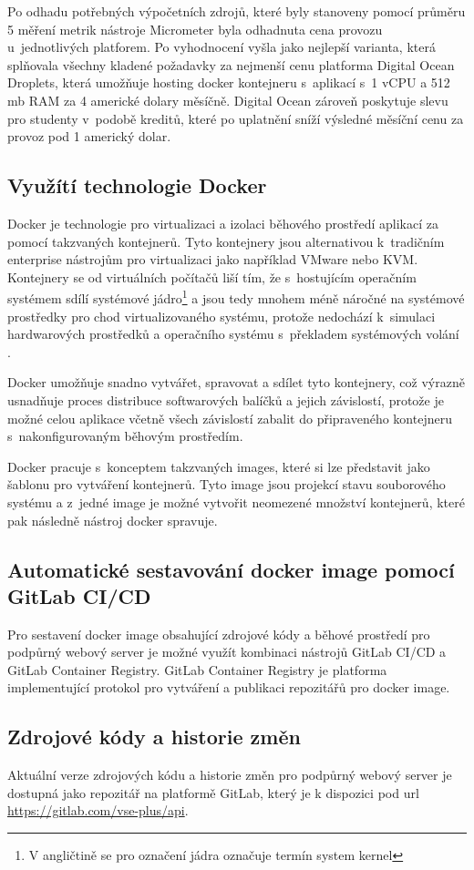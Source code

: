 Po odhadu potřebných výpočetních zdrojů, které byly stanoveny pomocí průměru 5 měření metrik nástroje Micrometer byla odhadnuta cena provozu u~jednotlivých platforem. Po vyhodnocení vyšla jako nejlepší varianta, která splňovala všechny kladené požadavky za nejmenší cenu platforma Digital Ocean Droplets, která umožňuje hosting docker kontejneru s~aplikací s~1 vCPU a 512 mb RAM za 4 americké dolary měsíčně. Digital Ocean zároveň poskytuje slevu pro studenty v~podobě kreditů, které po uplatnění sníží výsledné měsíční cenu za provoz pod 1 americký dolar.  


\subsection{Využítí technologie Docker}\label{sec:docker}

Docker je technologie pro virtualizaci a izolaci běhového prostředí aplikací za pomocí takzvaných kontejnerů. Tyto kontejnery jsou alternativou k~tradičním enterprise nástrojům pro virtualizaci jako například VMware nebo KVM. Kontejnery se od virtuálních počítačů liší tím, že s~hostujícím operačním systémem sdílí systémové jádro\footnote{V angličtině se pro označení jádra označuje termín system kernel} a jsou tedy mnohem méně náročné na systémové prostředky pro chod virtualizovaného systému, protože nedochází k~simulaci hardwarových prostředků a operačního systému s~překladem systémových volání \cite[kap. 1]{kane_docker_2018}.

Docker umožňuje snadno vytvářet, spravovat a sdílet tyto kontejnery, což výrazně usnadňuje proces distribuce softwarových balíčků a jejich závislostí, protože je možné celou aplikace včetně všech závislostí zabalit do připraveného kontejneru s~nakonfigurovaným běhovým prostředím. 

Docker pracuje s~konceptem takzvaných images, které si lze představit jako šablonu pro vytváření kontejnerů. Tyto image jsou projekcí stavu souborového systému a z~jedné image je možné vytvořit neomezené množství kontejnerů, které pak následně nástroj docker spravuje. 

\subsection{Automatické sestavování docker image pomocí GitLab CI/CD}

Pro sestavení docker image obsahující zdrojové kódy a běhové prostředí pro podpůrný webový server je možné využít kombinaci nástrojů GitLab CI/CD a GitLab Container Registry. GitLab Container Registry je platforma implementující protokol pro vytváření a publikaci repozitářů pro docker image.

\subsection{Zdrojové kódy a historie změn}

Aktuální verze zdrojových kódu a historie změn pro podpůrný webový server je dostupná jako repozitář na platformě GitLab, který je k dispozici pod url \url{https://gitlab.com/vse-plus/api}.